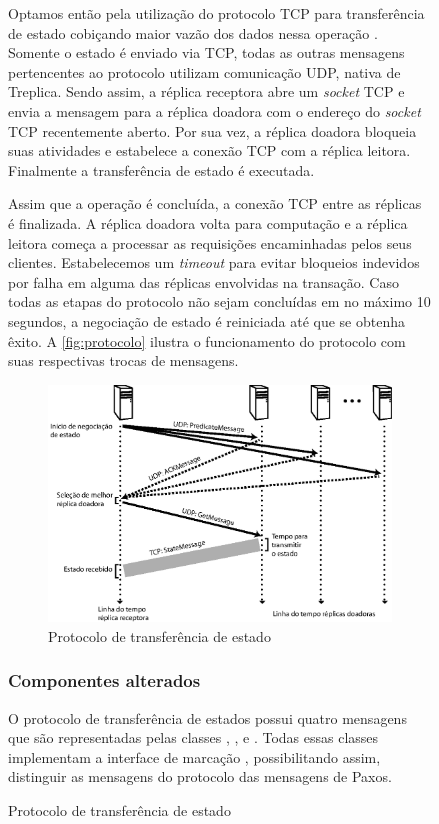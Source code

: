 \begin{figure}[ht]
Optamos então pela utilização do protocolo TCP para transferência de estado cobiçando
maior vazão dos dados nessa operação \cite{abdellatif04}. Somente o estado é enviado via
TCP, todas as outras mensagens pertencentes ao protocolo utilizam comunicação UDP, nativa
de Treplica. Sendo assim, a réplica receptora abre um \emph{socket} TCP e envia a mensagem
 para a réplica doadora com o endereço do \emph{socket} TCP
recentemente aberto. Por sua vez, a réplica doadora bloqueia suas atividades e estabelece
a conexão TCP com a réplica leitora. Finalmente a transferência de estado é executada.

Assim que a operação é concluída, a conexão TCP entre as réplicas é finalizada. A réplica
doadora volta para computação e a réplica leitora começa a processar as requisições
encaminhadas pelos seus clientes. Estabelecemos um \emph{timeout} para evitar bloqueios
indevidos por falha em alguma das réplicas envolvidas na transação. Caso todas as etapas
do protocolo não sejam concluídas em no máximo 10 segundos, a negociação de estado é
reiniciada até que se obtenha êxito. A \autoref{fig:protocolo} ilustra o funcionamento do
protocolo com suas respectivas trocas de mensagens.

\begin{figure}[ht]
  \centering
  \includegraphics[width=11cm]{conteudo/capitulos/figuras/transferencia_estado.eps}
  \caption{Protocolo de transferência de estado}
  \label{fig:protocolo}
\end{figure}

\subsubsection{Componentes alterados}

O protocolo de transferência de estados possui quatro mensagens que são representadas
pelas classes , ,  e
. Todas essas classes implementam a interface de marcação
, possibilitando assim, distinguir as mensagens do
protocolo das mensagens de Paxos.


\end{figure}
